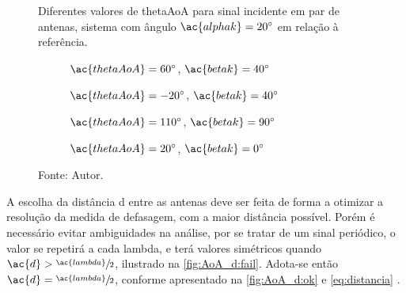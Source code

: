\begin{figure}
    \caption{Diferentes valores de \ac{thetaAoA} para sinal incidente em par de antenas, sistema com ângulo $\ac{alphak}=\SI{20}{\degree}$ em relação à referência.}
    \label{fig:AoA}

    \hfill
    \begin{subfigure}[b]{0.45\textwidth}
        \centering
        \caption{$ \ac{thetaAoA} = \SI{60}{\degree} $, $ \ac{betak} = \SI{40}{\degree} $}
        
        \label{fig:AoA:1}
    \end{subfigure}
    \hfill
    \begin{subfigure}[b]{0.45\textwidth}
        \centering
        \caption{$ \ac{thetaAoA} = \SI{-20}{\degree} $, $ \ac{betak} = \SI{40}{\degree} $}
        
        \label{fig:AoA:2}
    \end{subfigure}
    \hfill

    \vspace{\floatsep}

    \hfill
    \begin{subfigure}[b]{0.45\textwidth}
        \centering
        \caption{ $\ac{thetaAoA}=\SI{110}{\degree} $, $ \ac{betak} = \SI{90}{\degree} $}
        
        \label{fig:AoA:3}
    \end{subfigure}
    \hfill
    \begin{subfigure}[b]{0.45\textwidth}
        \centering
        \caption{$ \ac{thetaAoA}=\SI{20}{\degree} $, $ \ac{betak} = \SI{0}{\degree} $}
        
        \label{fig:AoA:4}
    \end{subfigure}
    \hfill

    \caption*{Fonte: Autor.}
\end{figure}


A escolha da distância \ac{d} entre as antenas deve ser feita de forma a otimizar a resolução da medida de defasagem, com a maior distância possível. Porém é necessário evitar ambiguidades na análise, por se tratar de um sinal periódico, o valor se repetirá a cada \ac{lambda}, e terá valores simétricos quando $\ac{d} > \sfrac{\ac{lambda}}{2}$, ilustrado na \autoref{fig:AoA_d:fail}.
Adota-se então $\ac{d}=\sfrac{\ac{lambda}}{2}$, conforme apresentado na \autoref{fig:AoA_d:ok} e \autoref{eq:distancia} \cite{bensky2016wireless, horst2021localization}.

